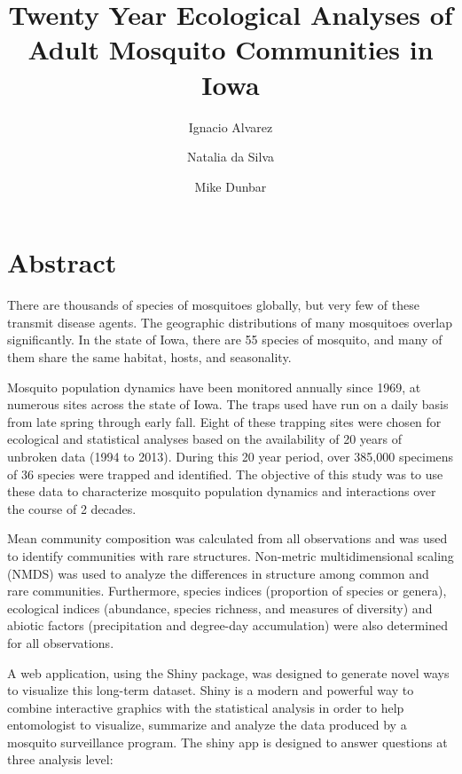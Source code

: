 \documentclass{article}\usepackage[]{graphicx}\usepackage[]{color}
\title{Twenty Year Ecological Analyses of Adult Mosquito Communities in Iowa}
\date{}
\author[1]{Ignacio Alvarez}
\author[1]{Natalia da Silva}
\author[2]{Mike Dunbar}
\affil[1]{Department of Statistics, Iowa State University}
\affil[2]{Department of Entomology, Iowa State University}
\begin{document}
\maketitle
\thispagestyle{empty}
\section*{Abstract}
There are thousands of species of mosquitoes globally, but very few of these transmit disease agents. The geographic distributions of many mosquitoes overlap significantly. In the state of Iowa, there are 55 species of mosquito, and many of them share the same habitat, hosts, and seasonality.  

Mosquito population dynamics have been monitored annually since 1969, at numerous sites across the state of Iowa.  The traps used have run on a daily basis from late spring through early fall. Eight of these trapping sites were chosen for ecological and statistical analyses based on the availability of 20 years of unbroken data (1994 to 2013). During this 20 year period, over 385,000 specimens of 36 species were trapped and identified. The objective of this study was to use these data to characterize mosquito population dynamics and interactions over the course of 2 decades. 

Mean community composition was calculated from all observations and was used to identify communities with rare structures. Non-metric multidimensional scaling (NMDS) was used to analyze the differences in structure among common and rare communities.  Furthermore, species indices (proportion of species or genera), ecological indices (abundance, species richness, and measures of diversity) and abiotic factors (precipitation and degree-day accumulation) were also determined for all observations. 

A web application, using the Shiny package, was designed to generate novel ways to visualize this long-term dataset. Shiny is a modern and powerful way to combine interactive graphics with the statistical analysis in order to help entomologist to visualize, summarize and analyze the data produced by a mosquito surveillance program. The shiny app is designed to answer questions at three analysis level:
\end{document}
